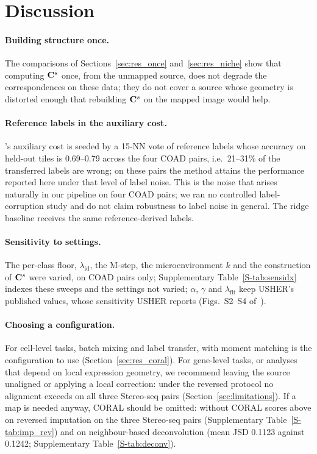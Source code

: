 \section{Discussion}\label{sec:discussion}

\paragraph{Building structure once.}
The comparisons of Sections~\ref{sec:res_once} and~\ref{sec:res_niche} show that computing $\mathbf{C}^{s}$ once, from the
unmapped source, does not degrade the correspondences on these data; they do not cover a source whose geometry is
distorted enough that rebuilding $\mathbf{C}^{s}$ on the mapped image would help.

\paragraph{Reference labels in the auxiliary cost.}
\frost's auxiliary cost is seeded by a 15-NN vote of reference labels whose accuracy on held-out tiles is 0.69--0.79
across the four COAD pairs, i.e.\ 21--31\% of the transferred labels are wrong; on these pairs the method attains
the performance reported here under that level of label noise. This is the noise that arises naturally in our
pipeline on four COAD pairs; we ran no controlled label-corruption study and do not claim robustness to label noise
in general. The ridge baseline receives the same reference-derived labels.

\paragraph{Sensitivity to settings.}
The per-class floor, $\lambda_{\mathrm{id}}$, the M-step, the microenvironment $k$ and the
construction of $\mathbf{C}^{s}$ were varied, on COAD pairs only; Supplementary Table~\ref{S-tab:sensidx} indexes these sweeps
and the settings not varied; $\alpha$, $\gamma$ and $\lambda_{\mathrm{fit}}$ keep USHER's published values, whose sensitivity USHER
reports (Figs.~S2--S4 of~\citep{pratapa2025usher}).

\paragraph{Choosing a configuration.}
For cell-level tasks, batch mixing and label transfer, \frost with moment matching is the configuration to use
(Section~\ref{sec:res_coral}). For gene-level tasks, or analyses that depend on local
expression geometry, we recommend leaving the source unaligned or applying a local correction: under the
reversed protocol no alignment exceeds \frost on all three Stereo-seq pairs
(Section~\ref{sec:limitations}). If a \frost map is needed anyway, CORAL should be omitted: \frost without CORAL
scores above \frost on reversed imputation on the three Stereo-seq pairs (Supplementary Table~\ref{S-tab:imp_rev}) and
on neighbour-based deconvolution (mean JSD 0.1123 against 0.1242; Supplementary Table~\ref{S-tab:deconv}).

